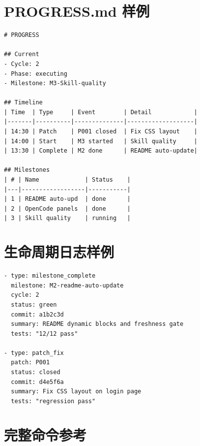 \documentclass[
  outputdir=build,
  chapterstyle=cn,
  colorscheme=Simple,
  fontset=tech,
  code=false
]{Hypo-Note}
\begin{document}
\section{PROGRESS.md 样例}

\begin{lstlisting}[language={}]
# PROGRESS

## Current
- Cycle: 2
- Phase: executing
- Milestone: M3-Skill-quality

## Timeline
| Time  | Type     | Event        | Detail            |
|-------|----------|--------------|-------------------|
| 14:30 | Patch    | P001 closed  | Fix CSS layout    |
| 14:00 | Start    | M3 started   | Skill quality     |
| 13:30 | Complete | M2 done      | README auto-update|

## Milestones
| # | Name             | Status    |
|---|------------------|-----------|
| 1 | README auto-upd  | done      |
| 2 | OpenCode panels  | done      |
| 3 | Skill quality    | running   |
\end{lstlisting}

\section{生命周期日志样例}

\begin{lstlisting}[language={}]
- type: milestone_complete
  milestone: M2-readme-auto-update
  cycle: 2
  status: green
  commit: a1b2c3d
  summary: README dynamic blocks and freshness gate
  tests: "12/12 pass"

- type: patch_fix
  patch: P001
  status: closed
  commit: d4e5f6a
  summary: Fix CSS layout on login page
  tests: "regression pass"
\end{lstlisting}

\section{完整命令参考}
\end{document}
